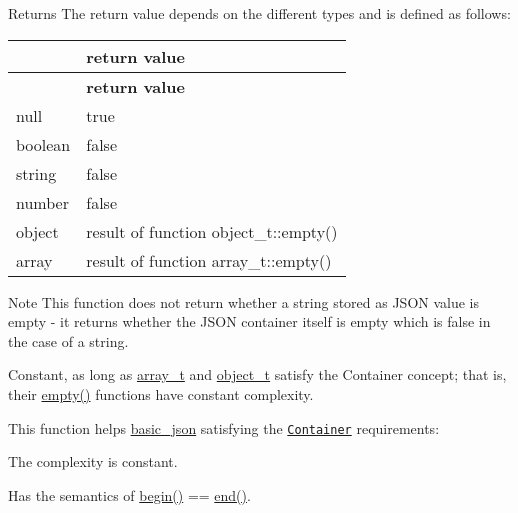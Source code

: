 \begin{DoxyReturn}{Returns}
The return value depends on the different types and is defined as follows\+: \tabulinesep=1mm
\begin{longtabu} spread 0pt [c]{*{2}{|X[-1]}|}
\hline
{}&{\bf return value  }\\
\endfirsthead
\hline
\endfoot
\hline
{}&{\bf return value  }\\
\endhead
null &{\ttfamily true} \\
boolean &{\ttfamily false} \\
string &{\ttfamily false} \\
number &{\ttfamily false} \\
object &result of function {\ttfamily object\+\_\+t\+::empty()} \\
array &result of function {\ttfamily array\+\_\+t\+::empty()} \\
\end{longtabu}

\end{DoxyReturn}
\begin{DoxyNote}{Note}
This function does not return whether a string stored as J\+S\+ON value is empty -\/ it returns whether the J\+S\+ON container itself is empty which is false in the case of a string.
\end{DoxyNote}
Constant, as long as \hyperlink{classnlohmann_1_1basic__json_ab00b882d39306d663c23dab110f5cae0}{array\+\_\+t} and \hyperlink{classnlohmann_1_1basic__json_a0ac9894c9de8dc551cf2e5f1c605537f}{object\+\_\+t} satisfy the Container concept; that is, their {\ttfamily \hyperlink{classnlohmann_1_1basic__json_ae3fe0423252e171973cdd5786d036e30}{empty()}} functions have constant complexity.

This function helps {\ttfamily \hyperlink{classnlohmann_1_1basic__json}{basic\+\_\+json}} satisfying the \href{http://en.cppreference.com/w/cpp/concept/Container}{\tt Container} requirements\+:
\begin{DoxyItemize}
\item The complexity is constant.
\item Has the semantics of {\ttfamily \hyperlink{classnlohmann_1_1basic__json_ad4e381c54039607be08d7af41a1f6ad1}{begin()} == \hyperlink{classnlohmann_1_1basic__json_a12ccf14d39ddae52f6c7e126105a230b}{end()}}.
\end{DoxyItemize}

